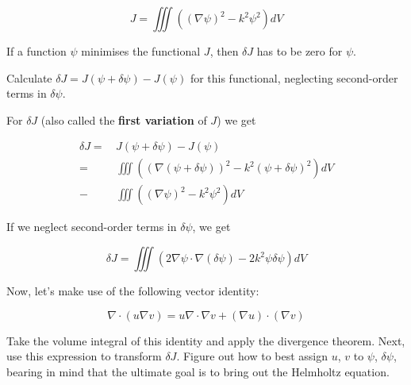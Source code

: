 \begin{equation}
J = \iiint \left((\nabla \psi)^2 - k^2 \psi^2 \right) dV \label{eq-variational1}
\end{equation} 

\noindent{}If a function $\psi$ minimises the functional $J$, then $\delta J$ has to be zero for $\psi$.

\begin{cue}
Calculate $\delta J = J(\psi + \delta \psi) - J(\psi)$ for this functional, neglecting second-order terms in $\delta \psi$.
\end{cue}

\noindent{}For $\delta J$ (also called the \textbf{first variation} of $J$) we get

\begin{align}
\delta J =& \, J(\psi + \delta \psi) - J(\psi) \nonumber \\
  =& \, \iiint \left( (\nabla (\psi + \delta \psi))^2 - k^2 (\psi + \delta \psi)^2 \right) dV \nonumber   \\
  -& \, \iiint \left((\nabla \psi)^2 - k^2 \psi^2 \right) dV
\end{align} 

If we neglect second-order terms in $\delta \psi$, we get

\begin{equation}
\delta J = \iiint \left( 2 \nabla \psi \cdot \nabla (\delta \psi) - 2 k^2 \psi \delta \psi \right) dV \label{eq-var-helmholtz-1}
\end{equation}

Now, let's make use of the following vector identity:

\begin{equation}
\nabla \cdot (u \nabla v) = u \nabla \cdot \nabla v + (\nabla u) \cdot (\nabla v) \label{eq-vector-id-green-other}
\end{equation} 

\noindent{}

\begin{cue}
Take the volume integral of this identity and apply the divergence theorem. Next, use this expression to transform $\delta J$. Figure out how to best assign $u$, $v$ to $\psi$, $\delta \psi$, bearing in mind that the ultimate goal is to bring out the Helmholtz equation.
\end{cue}

